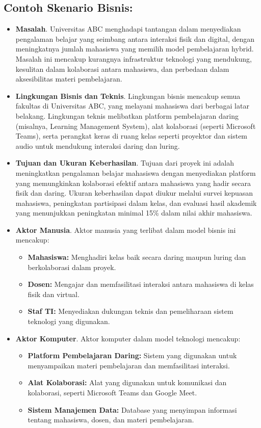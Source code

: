 \subsection*{Contoh Skenario Bisnis:}
\begin{itemize}
	\item \textbf{Masalah}. Universitas ABC menghadapi tantangan dalam menyediakan pengalaman belajar yang seimbang antara interaksi fisik dan digital, dengan meningkatnya jumlah mahasiswa yang memilih model pembelajaran hybrid. Masalah ini mencakup kurangnya infrastruktur teknologi yang mendukung, kesulitan dalam kolaborasi antara mahasiswa, dan perbedaan dalam aksesibilitas materi pembelajaran.
	
	\item \textbf{Lingkungan Bisnis dan Teknis}. Lingkungan bisnis mencakup semua fakultas di Universitas ABC, yang melayani mahasiswa dari berbagai latar belakang. Lingkungan teknis melibatkan platform pembelajaran daring (misalnya, Learning Management System), alat kolaborasi (seperti Microsoft Teams), serta perangkat keras di ruang kelas seperti proyektor dan sistem audio untuk mendukung interaksi daring dan luring.
	
	\item \textbf{Tujuan dan Ukuran Keberhasilan}. Tujuan dari proyek ini adalah meningkatkan pengalaman belajar mahasiswa dengan menyediakan platform yang memungkinkan kolaborasi efektif antara mahasiswa yang hadir secara fisik dan daring. Ukuran keberhasilan dapat diukur melalui survei kepuasan mahasiswa, peningkatan partisipasi dalam kelas, dan evaluasi hasil akademik yang menunjukkan peningkatan minimal 15\% dalam nilai akhir mahasiswa.
	
	\item \textbf{Aktor Manusia}. Aktor manusia yang terlibat dalam model bisnis ini mencakup:
	\begin{itemize}
		\item \textbf{Mahasiswa:} Menghadiri kelas baik secara daring maupun luring dan berkolaborasi dalam proyek.
		\item \textbf{Dosen:} Mengajar dan memfasilitasi interaksi antara mahasiswa di kelas fisik dan virtual.
		\item \textbf{Staf TI:} Menyediakan dukungan teknis dan pemeliharaan sistem teknologi yang digunakan.
	\end{itemize}
	
	\item \textbf{Aktor Komputer}. Aktor komputer dalam model teknologi mencakup:
	\begin{itemize}
		\item \textbf{Platform Pembelajaran Daring:} Sistem yang digunakan untuk menyampaikan materi pembelajaran dan memfasilitasi interaksi.
		\item \textbf{Alat Kolaborasi:} Alat yang digunakan untuk komunikasi dan kolaborasi, seperti Microsoft Teams dan Google Meet.
		\item \textbf{Sistem Manajemen Data:} Database yang menyimpan informasi tentang mahasiswa, dosen, dan materi pembelajaran.
	\end{itemize}
	

\end{itemize}
